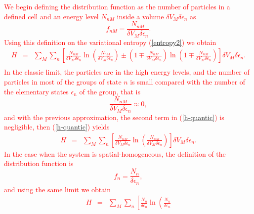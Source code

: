 \documentclass{article}
\newcommand{\de}{\delta}
\begin{document}
\textcolor{red}{%
We begin defining the distribution function as the number of particles in a defined cell and an energy level $N_{nM}$ inside a volume $\de V_M \delta \epsilon_n$ as
\begin{equation}
    f_{nM}=\frac{N_{nM}}{ \de V_M \delta \epsilon_{n} }.
\end{equation}
Using this definition on the variational entropy (\ref{entropy2}) we obtain
\begin{eqnarray}
    H&=& \sum_M \sum_n
    \left[  
           \frac{N_{nM}}{ \de V_M\delta \epsilon_{n}} \ln 
           \left( 
                  \frac{N_{nM}}{ \de V_M\delta \epsilon_{n}}
           \right)\pm 
           \left(  
                  1\mp \frac{N_{nM}}{ \de V_M \delta \epsilon_{n}}
           \right) \ln 
           \left(  
                   1\mp \frac{N_{nM}}{ \de V_M \delta \epsilon_{n}}
           \right)
    \right] \de V_M \delta \epsilon_{n}. \nonumber \\
    \label{h-quantic} 
\end{eqnarray}
In the classic limit, the particles are in the high energy levels, and the number of particles in most of the groups of state $n$ is small compared with the number of the elementary states $\epsilon_n$ of the group, that is
\begin{equation}
    \frac{N_{nM}}{ \de V_M \delta \epsilon_{n} } \approx 0,
\end{equation}
and with the previous approximation, the second term in (\ref{h-quantic}) is negligible, then (\ref{h-quantic}) yields
\begin{eqnarray}
    H&=& \sum_M \sum_n
    \left[  
           \frac{N_{nM}}{ \de V_M \delta \epsilon_{n}} \ln 
           \left( 
                  \frac{N_{nM}}{ \de V_M \delta \epsilon_{n}}
           \right)
    \right] \de V_M \delta \epsilon_{n}. \label{h-quantic2}
\end{eqnarray}
In the case when the system is spatial-homogeneous, the definition of the distribution function is 
\begin{equation}
    f_{n}=\frac{N_{n}}{ \delta \epsilon_{n} },
\end{equation}
and using the same limit we obtain
\begin{eqnarray}
    H&=& \sum_M \sum_n
    \left[  
           \frac{N_{n}}{ \delta \epsilon_{n}} \ln 
           \left( 
                  \frac{N_{n}}{ \delta \epsilon_{n}}

\end{eqnarray}}
\end{document}
